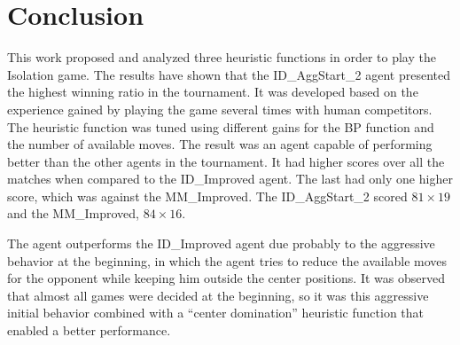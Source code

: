 \documentclass[12pt, a4paper]{article}
\begin{document}
\section{Conclusion}

	This work proposed and analyzed three heuristic functions in order to play the Isolation game. The results have shown that the ID\_AggStart\_2 agent presented the highest winning ratio in the tournament. It was developed based on the experience gained by playing the game several times with human competitors. The heuristic function was tuned using different gains for the BP function and the number of available moves. The result was an agent capable of performing better than the other agents in the tournament. It had higher scores over all the matches when compared to the ID\_Improved agent. The last had only one higher score, which was against the MM{\_}Improved. The ID\_AggStart\_2 scored $81 \times 19$ and the MM{\_}Improved, $84 \times 16$. 
	
	The agent outperforms the ID\_Improved agent due probably to the aggressive behavior at the beginning, in which the agent tries to reduce the available moves for the opponent while keeping him outside the center positions. It was observed that almost all games were decided at the beginning, so it was this aggressive initial behavior combined with a ``center domination'' heuristic function that enabled a better performance.
\end{document}
